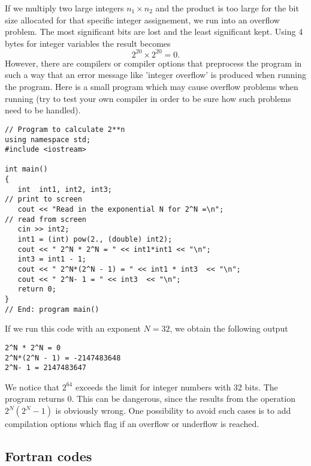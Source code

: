 If we multiply two large integers
$n_1\times n_2$ and the product is too large for the bit size allocated
for that specific integer assignement, we run into an overflow problem.
The most significant bits are lost and the least significant
kept. Using 4 bytes for integer variables the result becomes
%
\[
     2^{20} \times 2^{20} =0.
\]
%
However, there are compilers or compiler options that
preprocess the program in such a way that an error message
like 'integer overflow' is produced when running the program.
Here is a small program which may cause overflow problems when
running (try to test your own compiler in order to be sure
how such problems need to be handled).
\begin{lstlisting}[title={\url{http://folk.uio.no/mhjensen/compphys/programs/chapter02/cpp/program3.cpp}}]
// Program to calculate 2**n
using namespace std;
#include <iostream>

int main()
{
   int  int1, int2, int3;
// print to screen
   cout << "Read in the exponential N for 2^N =\n";    
// read from screen
   cin >> int2; 
   int1 = (int) pow(2., (double) int2);
   cout << " 2^N * 2^N = " << int1*int1 << "\n";
   int3 = int1 - 1;
   cout << " 2^N*(2^N - 1) = " << int1 * int3  << "\n";
   cout << " 2^N- 1 = " << int3  << "\n";
   return 0;
} 
// End: program main() 
\end{lstlisting}
If we run this code with an exponent $N=32$, we obtain the following output
\begin{tcolorbox}
\begin{verbatim}
2^N * 2^N = 0
2^N*(2^N - 1) = -2147483648
2^N- 1 = 2147483647
\end{verbatim}
\end{tcolorbox}
We notice that $2^{64}$ exceeds the limit for integer numbers with 32 bits.  The program returns $0$.
This can be dangerous, since the results from the operation $2^N(2^N-1)$ is obviously wrong.
One possibility to avoid such cases is to add compilation options which flag if an overflow or underflow
is reached.


\subsection{Fortran codes}

